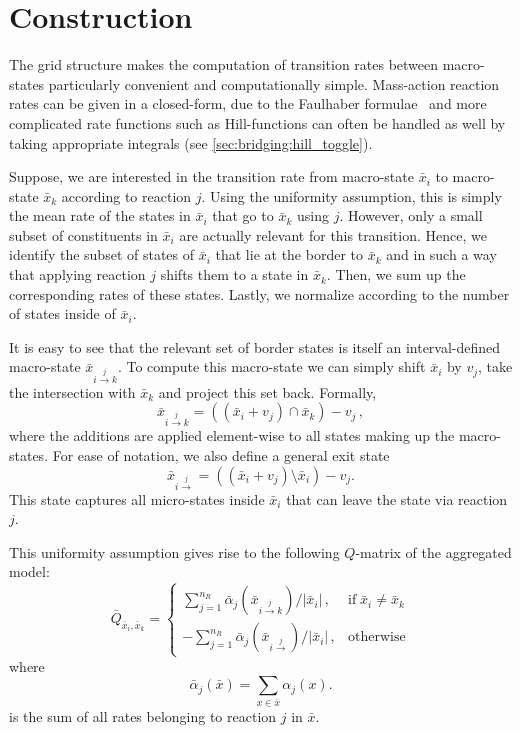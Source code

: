 \section{Construction}
The grid structure makes the computation of transition rates between macro-states particularly convenient and computationally simple.
Mass-action reaction rates can be given in a closed-form,
due to the Faulhaber formulae~\cite{knuth1993johann} and more complicated rate functions such as Hill-functions can often be handled as well by taking appropriate integrals (see \autoref{sec:bridging:hill_toggle}).

Suppose, we are interested in the transition rate from macro-state $\bar{x}_i$ to macro-state $\bar{x}_k$ according to reaction $j$.
Using the uniformity assumption, this is simply the mean rate of the states in $\bar{x}_i$ that go to $\bar{x}_k$ using $j$.
However, only a small subset of constituents in $\bar{x}_i$ are actually relevant for this transition.
Hence, we identify the subset of states of $\bar{x}_i$ that lie at the border to $\bar{x}_k$ and in such a way that applying reaction $j$ shifts them to a state in $\bar{x}_k$. Then, we sum up the corresponding rates of these states. Lastly, we normalize according to the number of states inside of $\bar{x}_i$.

It is easy to see that the relevant set of border states is itself an
interval-defined macro-state $\bar{x}_{i\xrightarrow{j}k}$.
To compute this macro-state
we can simply shift $\bar{x}_i$ by $v_j$, take the intersection
with $\bar{x}_k$ and project this set back.
Formally,
\begin{equation}\label{eq:transition_set}
    \bar{x}_{i\xrightarrow{j}k} = ((\bar{x}_i + v_j) \cap \bar{x}_k) - v_j\,,
\end{equation}
where the additions are applied element-wise to all states
making up the macro-states.
For ease of notation, we also define a general exit state
\begin{equation}
    \bar{x}_{i\xrightarrow{j}} = ((\bar{x}_i + v_j) \setminus \bar{x}_i) - v_j.
\end{equation}
This state captures all micro-states inside $\bar{x}_i$ that can leave the state via reaction $j$.

This uniformity assumption gives rise to the following $Q$-matrix of the aggregated model:
\begin{equation}\label{eq:lumped_q}
    \bar{Q}_{ \bar{x}_i,  \bar{x}_k} = \begin{cases}
        \sum_{j=1}^{n_R}{\bar\alpha}_j\left(\bar{x}_{i\xrightarrow{j}k}\right)/\left|\bar{x}_i\right|\,,&\text{if}\; \bar{x}_i\neq \bar{x}_k\\[1ex]
        -\sum_{j=1}^{n_R}{\bar\alpha}_j\left(\bar{x}_{i\xrightarrow{j}}\right)/{\left|\bar{x}_i\right|}\,, &\text{otherwise}
    \end{cases}
\end{equation}
where 
\begin{equation}\label{eq:lumped_propfun}
    \bar{\alpha}_j({\bar{x}}) = \sum_{x\in \bar{x}} \alpha_j(x).
\end{equation}
is the sum of all rates belonging to reaction $j$ in $\bar{x}$.



